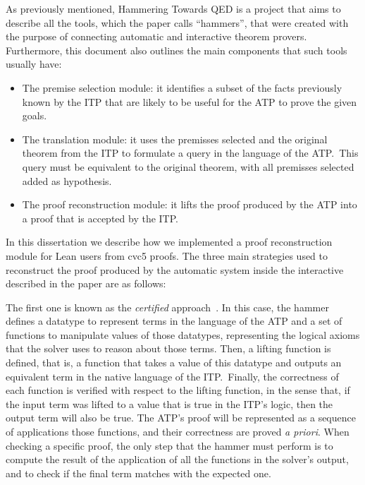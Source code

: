 \label{sec:hammering}
As previously mentioned, Hammering Towards QED is a project
that aims to describe all the tools, which the paper calls ``hammers'',
that were created with the purpose of connecting automatic and interactive
theorem provers. Furthermore, this document also outlines
the main components that such tools usually have:

\begin{itemize}
  \item The premise selection module: it identifies
        a subset of the facts previously known by the
        ITP that are likely to be useful for the ATP to
        prove the given goals.\@
  \item The translation module: it uses the premisses selected and the original
        theorem from the ITP to formulate a query in the language of the ATP.\ This query
        must be equivalent to the original theorem, with all premisses selected
        added as hypothesis.
  \item The proof reconstruction module: it lifts the proof produced
        by the ATP into a proof that is accepted by the ITP.\@
\end{itemize}

In this dissertation we describe how we implemented a proof reconstruction module
for Lean users from cvc5 proofs.
The three main strategies used to reconstruct the proof produced
by the automatic system inside the interactive described in the paper are as follows:

The first one is known as the \textit{certified} approach~\cite{snipe}. In this case,
the hammer defines a datatype to represent
terms in the language of the ATP and a set of functions to manipulate
values of those datatypes, representing
the logical axioms that the solver uses to reason about those terms. Then, a lifting function is defined, that is,
a function that takes a value of this datatype and outputs an equivalent term in the native
language of the ITP.\ Finally, the correctness of each function is
verified with respect to the lifting function, in the sense that, if the input term
was lifted to a value that is true in the ITP's logic, then the output term will
also be true. The ATP's proof will be represented as a sequence of applications those
functions, and their correctness are proved \textit{a priori}. When checking
a specific proof, the only step that the hammer must perform is to compute the result
of the application of all the functions in the solver's output, and to check if
the final term matches with the expected one.

